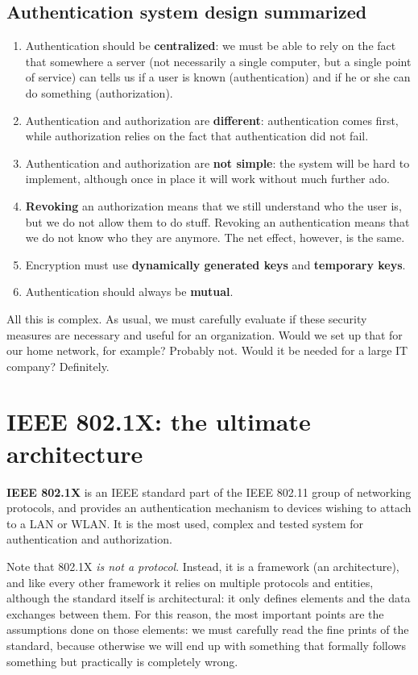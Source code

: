 \subsection{Authentication system design summarized}
\begin{enumerate}
    \item Authentication should be \textbf{centralized}: we must be able to rely on the fact that somewhere a server (not necessarily a single computer, but a single point of service) can tells us if a user is known (authentication) and if he or she can do something (authorization).
    \item Authentication and authorization are \textbf{different}: authentication comes first, while authorization relies on the fact that authentication did not fail.
    \item Authentication and authorization are \textbf{not simple}: the system will be hard to implement, although once in place it will work without much further ado.
    \item \textbf{Revoking} an authorization means that we still understand who the user is, but we do not allow them to do stuff. Revoking an authentication means that we do not know who they are anymore. The net effect, however, is the same.
    \item Encryption must use \textbf{dynamically generated keys} and \textbf{temporary keys}.
    \item Authentication should always be \textbf{mutual}.
\end{enumerate}
 
All this is complex. As usual, we must carefully evaluate if these security measures are necessary and useful for an organization. Would we set up that for our home network, for example? Probably not. Would it be needed for a large IT company? Definitely.
 

\section{IEEE 802.1X: the ultimate architecture}
\textbf{IEEE 802.1X} is an IEEE standard part of the IEEE 802.11 group of networking protocols, and provides an authentication mechanism to devices wishing to attach to a LAN or WLAN. It is the most used, complex and tested system for authentication and authorization.
 
Note that 802.1X \textit{is not a protocol}. Instead, it is a framework (an architecture), and like every other framework it relies on multiple protocols and entities, although the standard itself is architectural: it only defines elements and the data exchanges between them. For this reason, the most important points are the assumptions done on those elements: we must carefully read the fine prints of the standard, because otherwise we will end up with something that formally follows something but practically is completely wrong.

